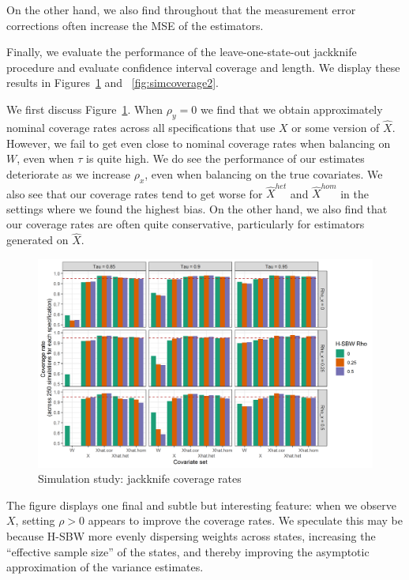 On the other hand, we also find throughout that the measurement error corrections often increase the MSE of the estimators.

Finally, we evaluate the performance of the leave-one-state-out jackknife procedure and evaluate confidence interval coverage and length. We display these results in Figures~\ref{fig:simcoverage1} and ~\ref{fig:simcoverage2}. 

We first discuss Figure~\ref{fig:simcoverage1}. When $\rho_y = 0$ we find that we obtain approximately nominal coverage rates across all specifications that use $X$ or some version of $\hat{X}$. However, we fail to get even close to nominal coverage rates when balancing on $W$, even when $\tau$ is quite high. We do see the performance of our estimates deteriorate as we increase $\rho_x$, even when balancing on the true covariates. We also see that our coverage rates tend to get worse for $\hat{X}^{het}$ and $\hat{X}^{hom}$ in the settings where we found the highest bias. On the other hand, we also find that our coverage rates are often quite conservative, particularly for estimators generated on $\hat{X}$. 

\begin{figure}[H]
\begin{center}
    \caption{Simulation study: jackknife coverage rates}\label{fig:simcoverage1}
    \includegraphics[scale=0.5]{01_Plots/coverage-plot-1.png}
\end{center}
\end{figure}

The figure displays one final and subtle but interesting feature: when we observe $X$, setting $\rho > 0$ appears to improve the coverage rates. We speculate this may be because H-SBW more evenly dispersing weights across states, increasing the ``effective sample size'' of the states, and thereby improving the asymptotic approximation of the variance estimates. 

